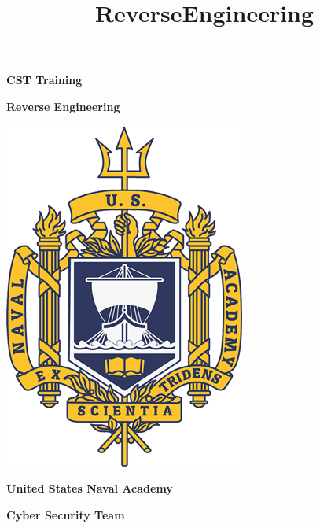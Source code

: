 \documentclass{report}
\title{ReverseEngineering}
\begin{document}
\begin{titlepage}
    \vspace*{-2cm}
    \begin{center}
        {\Huge \bfseries CST Training \par}
        \vspace{1cm}
        {\large \bfseries Reverse Engineering  \par}

    \end{center}
    \begin{center}
        \vspace{3cm}
        \includegraphics[scale=.6]{usna-seal.png}
        \vspace{1cm}
    \end{center}
    

  
    \begin{center}
        {\LARGE\bfseries United States Naval Academy \break \par}
        {\Large\bfseries Cyber Security Team \par}

    \end{center}
  
    \vspace{3.0cm}
   


\end{titlepage}


\newpage
\end{document}
